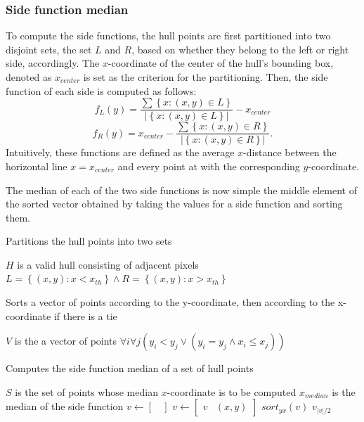 \documentclass[times, utf8, zavrsni]{fer}
\begin{document}
\subsubsection{Side function median}

To compute the side functions, the hull points are first partitioned into
two disjoint sets, the set $L$ and $R$, based on whether they belong to the left
or right side, accordingly. The $x$-coordinate of the center of the hull's
bounding box, denoted as $x_{center}$ is set as the criterion for the
partitioning. Then, the side function of each side is computed as follows:
\[f_L(y) = \frac{\sum{\left\{x : (x, y) \in L\right\} }}
{|\left\{ x : (x, y) \in L\right\} |} - x_{center}\]
\[f_R(y) = x_{center} - \frac{\sum{\left\{x : (x, y) \in R\right\} }}
{|\left\{ x : (x, y) \in R\right\} |}.\]
Intuitively, these functions are defined as the average $x$-distance between the
horizontal line $x = x_{center}$ and every point at with the corresponding
$y$-coordinate.

The median of each of the two side functions is now simple the middle element of
the sorted vector obtained by taking the values for a side function and sorting
them.

\begin{algorithm} 
\caption{Partitions the hull points into two sets}
\label{algo:side-function-partition}
\begin{algorithmic}
\REQUIRE $H$ is a valid hull consisting of adjacent pixels
\ENSURE $L = \left\{ (x, y) : x < x_{th} \right\} \land 
R = \left\{ (x, y) : x > x_{th} \right\}$
\end{algorithmic}
\end{algorithm}

\begin{algorithm} 
\caption{Sorts a vector of points according to the y-coordinate, then
according to the x-coordinate if there is a tie}
\label{algo:sort-yx}
\begin{algorithmic}
\REQUIRE $V$ is the a vector of points
\ENSURE $\forall i \forall j (y_i < y_j \lor (y_i = y_j \land x_i \leq x_j))$
\end{algorithmic}
\end{algorithm}

\begin{algorithm} 
\caption{Computes the side function median of a set of hull points}
\label{algo:side-function}
\begin{algorithmic}
\REQUIRE $S$ is the set of points whose median $x$-coordinate is to be computed
\ENSURE $x_{median}$ is the median of the side function
\STATE $v \gets \begin{bmatrix}\,\end{bmatrix}$
\STATE $v \gets \begin{bmatrix}v & (x, y)\end{bmatrix}$ 
\ENDFOR
\STATE $sort_{yx}(v)$
\RETURN $v_{|v| / 2}$
\end{algorithmic}
\end{algorithm}
\end{document}
